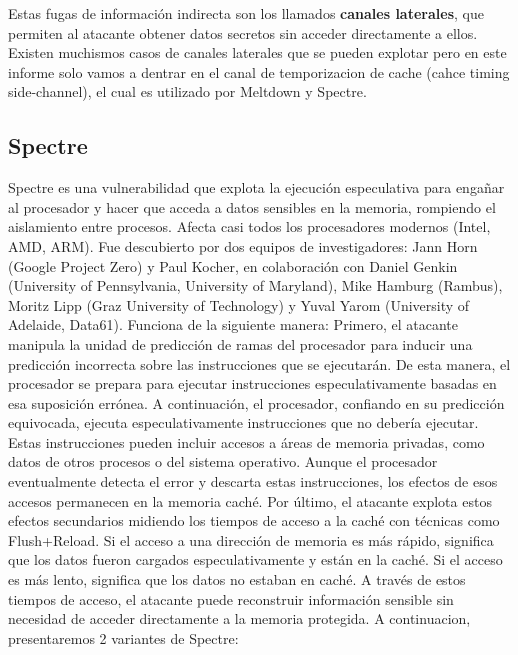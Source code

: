 \documentclass[lettersize,compsoc]{IEEEtran}
\begin{document}
Estas fugas de información indirecta son los llamados \textbf{canales laterales}, que permiten al atacante obtener datos secretos sin acceder directamente a ellos. \newline
Existen muchismos casos de canales laterales que se pueden explotar\cite{Side Channel tipos} pero en este informe solo vamos a dentrar en el canal de temporizacion de cache (cahce timing side-channel), el cual es utilizado por Meltdown y Spectre.
\subsection{Spectre}
Spectre es una vulnerabilidad que explota la ejecución especulativa para engañar al procesador y hacer que acceda a datos sensibles en la memoria, rompiendo el aislamiento entre procesos. \cite{Spectre}
\newline Afecta casi todos los procesadores modernos (Intel, AMD, ARM).
\newline Fue descubierto por dos equipos de investigadores: Jann Horn (Google Project Zero) y Paul Kocher, en colaboración con Daniel Genkin (University of Pennsylvania, University of Maryland), Mike Hamburg (Rambus), Moritz Lipp (Graz University of Technology) y Yuval Yarom (University of Adelaide, Data61).
\newline Funciona de la siguiente manera:
Primero, el atacante manipula la unidad de predicción de ramas del procesador para inducir una predicción incorrecta sobre las instrucciones que se ejecutarán. De esta manera, el procesador se prepara para ejecutar instrucciones especulativamente basadas en esa suposición errónea.
A continuación, el procesador, confiando en su predicción equivocada, ejecuta especulativamente instrucciones que no debería ejecutar. Estas instrucciones pueden incluir accesos a áreas de memoria privadas, como datos de otros procesos o del sistema operativo. Aunque el procesador eventualmente detecta el error y descarta estas instrucciones, los efectos de esos accesos permanecen en la memoria caché.
Por último, el atacante explota estos efectos secundarios midiendo los tiempos de acceso a la caché con técnicas como Flush+Reload. Si el acceso a una dirección de memoria es más rápido, significa que los datos fueron cargados especulativamente y están en la caché. Si el acceso es más lento, significa que los datos no estaban en caché. A través de estos tiempos de acceso, el atacante puede reconstruir información sensible sin necesidad de acceder directamente a la memoria protegida. \cite{Spectre}
\newline A continuacion, presentaremos 2 variantes de Spectre:
\end{document}
